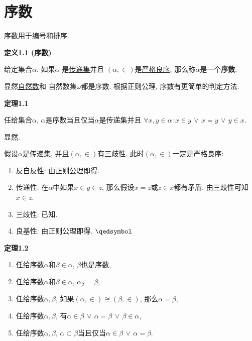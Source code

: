 \documentclass[UTF8]{ctexart}
\begin{document}
\setlength{\abovedisplayskip}{1pt}
\setlength{\belowdisplayskip}{1pt}

\section{序数}

序数用于编号和排序.

\vspace{10pt}

\hypertarget{sec:定义1.1}{}
\noindent\textbf{定义1.1 (序数)}

给定集合$\alpha$. 如果$\alpha$
是\href{../../03 自然数/01 自然数/02 传递集#nameddest=sec:定义1.1}{传递集}并且
$(\alpha,\in)$是\href{../01 序关系/04 良序关系#nameddest=sec:定义1.1}{严格良序},
那么称$\alpha$是一个\textbf{序数}.

\vspace{10pt}

显然\href{../../03 自然数/01 自然数/01 自然数#nameddest=sec:定义1.3}{自然数}和
自然数集$\omega$都是序数.
根据正则公理, 序数有更简单的判定方法.

\vspace{10pt}

\hypertarget{sec:定理1.1}{}
\noindent\textbf{定理1.1}

任给集合$\alpha$, $\alpha$是序数当且仅当$\alpha$是传递集并且
$\forall x,y\in\alpha:x\in y\,\lor\,x=y\,\lor\,y\in x$.


 显然.


假设$\alpha$是传递集, 并且$(\alpha,\in)$有三歧性. 此时$(\alpha,\in)$一定是严格良序:
\begin{enumerate}
    \item 反自反性: 由正则公理即得.
    \item 传递性: 在$\alpha$中如果$x\in y\in z$, 那么假设$x=z$或$z\in x$都有矛盾.
    由三歧性可知$x\in z$.
    \item 三歧性: 已知.
    \item 良基性: 由正则公理即得. \hfill $\qedsymbol$
\end{enumerate}

\vspace{10pt}

\hypertarget{sec:定理1.2}{}
\noindent\textbf{定理1.2}

\begin{enumerate}
    \item 任给序数$\alpha$和$\beta\in\alpha$, $\beta$也是序数,
    \item 任给序数$\alpha$和$\beta\in\alpha$, $\alpha_\beta=\beta$,
    \item 任给序数$\alpha,\beta$,
    如果$(\alpha,\in)\cong(\beta,\in)$, 那么$\alpha=\beta$,
    \item 任给序数$\alpha,\beta$,
    有$\alpha\in\beta\,\lor\,\alpha=\beta\,\lor\,\beta\in\alpha$,
    \item 任给序数$\alpha,\beta$,
    $\alpha\subset\beta$当且仅当$\alpha\in\beta\,\lor\,\alpha=\beta$.
\end{enumerate}
\end{document}
